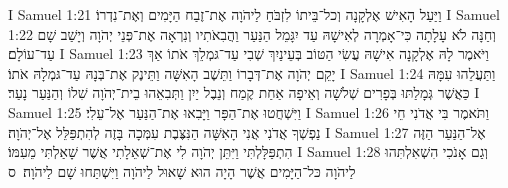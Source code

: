 I Samuel 1:21	וַיַּעַל הָאִישׁ אֶלְקָנָה וְכל־בֵּיתוֹ לִזְבֹּחַ לַיהֹוָה אֶת־זֶבַח הַיָּמִים וְאֶת־נִדְרוֹ׃
I Samuel 1:22	וְחַנָּה לֹא עָלָתָה כִּי־אָמְרָה לְאִישָׁהּ עַד יִגָּמֵל הַנַּעַר וַהֲבִאֹתִיו וְנִרְאָה אֶת־פְּנֵי יְהֹוָה וְיָשַׁב שָׁם עַד־עוֹלָם׃
I Samuel 1:23	וַיֹּאמֶר לָהּ אֶלְקָנָה אִישָׁהּ עֲשִׂי הַטּוֹב בְּעֵינַיִךְ שְׁבִי עַד־גּמְלֵךְ אֹתוֹ אַךְ יָקֵם יְהֹוָה אֶת־דְּבָרוֹ וַתֵּשֶׁב הָאִשָּׁה וַתֵּינֶק אֶת־בְּנָהּ עַד־גּמְלָהּ אֹתוֹ׃
I Samuel 1:24	וַתַּעֲלֵהוּ עִמָּהּ כַּאֲשֶׁר גְּמָלַתּוּ בְּפָרִים שְׁלֹשָׁה וְאֵיפָה אַחַת קֶמַח וְנֵבֶל יַיִן וַתְּבִאֵהוּ בֵית־יְהֹוָה שִׁלוֹ וְהַנַּעַר נָעַר׃
I Samuel 1:25	וַיִּשְׁחֲטוּ אֶת־הַפָּר וַיָּבִאוּ אֶת־הַנַּעַר אֶל־עֵלִי׃
I Samuel 1:26	וַתֹּאמֶר בִּי אֲדֹנִי חֵי נַפְשְׁךָ אֲדֹנִי אֲנִי הָאִשָּׁה הַנִּצֶּבֶת עִמְּכָה בָּזֶה לְהִתְפַּלֵּל אֶל־יְהֹוָה׃
I Samuel 1:27	אֶל־הַנַּעַר הַזֶּה הִתְפַּלָּלְתִּי וַיִּתֵּן יְהֹוָה לִי אֶת־שְׁאֵלָתִי אֲשֶׁר שָׁאַלְתִּי מֵעִמּוֹ׃
I Samuel 1:28	וְגַם אָנֹכִי הִשְׁאִלְתִּהוּ לַיהֹוָה כּל־הַיָּמִים אֲשֶׁר הָיָה הוּא שָׁאוּל לַיהֹוָה וַיִּשְׁתַּחוּ שָׁם לַיהֹוָה׃ {ס}        
